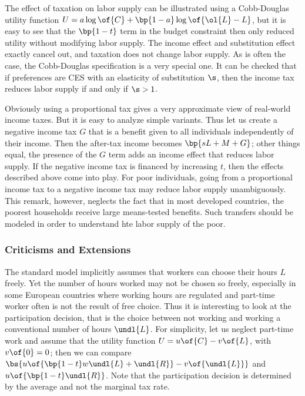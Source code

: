 The effect of taxation on labor supply can be illustrated using a Cobb-Douglas utility function $U = a\log\of{C} + \bp{1-a} \log\of{\ol{L} - L}$, but it is easy to see that the $\bp{1-t}$ term in the budget constraint then only reduced utility without modifying labor supply. The income effect and substitution effect exactly cancel out, and taxation does not change labor supply. As is often the case, the Cobb-Douglas specification is a very special one. It can be checked that if preferences are CES with an elasticity of substitution $\s$, then the income tax reduces labor supply if and only if $\s > 1$.

Obviously using a proportional tax gives a very approximate view of real-world income taxes. But it is easy to analyze simple variants. Thus let us create a negative income tax $G$ that is a benefit given to all individuals independently of their income. Then the after-tax income becomes $\bp{sL + M + G}$; other things equal, the presence of the $G$ term adds an income effect that reduces labor supply. If the negative income tax is financed by increasing $t$, then the effects described above come into play. For poor individuals, going from a proportional income tax to a negative income tax may reduce labor supply unambiguously. This remark, however, neglects the fact that in most developed countries, the poorest households receive large means-tested benefits. Such transfers should be modeled in order to understand hte labor supply of the poor.

\subsubsection{Criticisms and Extensions}

The standard model implicitly assumes that workers can choose their hours $L$ freely. Yet the number of hours worked may not be chosen so freely, especially in some European countries where working hours are regulated and part-time worker often is not the result of free choice. Thus it is interesting to look at the participation decision, that is the choice between not working and working a conventional number of hours $\undl{L}$. For simplicity, let us neglect part-time work and assume that the utility function $U = u\of{C} - v\of{L}$, with $v\of{0} = 0$; then we can compare $\bs{u\of{\bp{1-t}w \undl{L} + \undl{R}} - v\of{\undl{L}}}$ and $u\of{\bp{1-t} \undl{R}}$. Note that the participation decision is determined by the average and not the marginal tax rate. 


